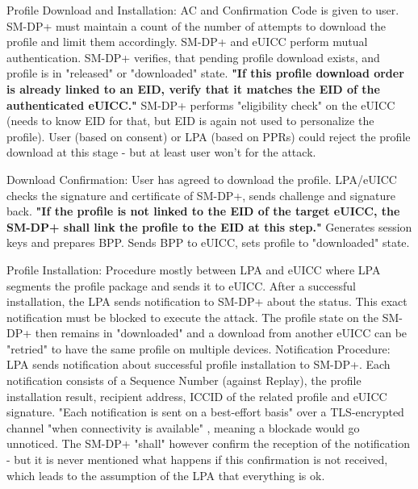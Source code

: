 Profile Download and Installation: AC and Confirmation Code is given to user. SM-DP+ must maintain a count of the number of attempts to download the profile and limit them accordingly. SM-DP+ and eUICC perform mutual authentication. SM-DP+ verifies, that pending profile download exists, and profile is in "released" or "downloaded" state. \textbf{"If this profile download order is already linked to an EID, verify that it matches the EID of the authenticated eUICC."} SM-DP+ performs "eligibility check" on the eUICC (needs to know EID for that, but EID is again not used to personalize the profile). User (based on consent) or LPA (based on PPRs) could reject the profile download at this stage - but at least user won't for the attack.

Download Confirmation: User has agreed to download the profile. LPA/eUICC checks the signature and certificate of SM-DP+, sends challenge and signature back. \textbf{"If the profile is not linked to the EID of the target eUICC, the SM-DP+ shall link the profile to the EID at this step."} Generates session keys and prepares BPP. Sends BPP to eUICC, sets profile to "downloaded" state.

Profile Installation: Procedure mostly between LPA and eUICC where LPA segments the profile package and sends it to eUICC. After a successful installation, the LPA sends notification to SM-DP+ about the status. This exact notification must be blocked to execute the attack. The profile state on the SM-DP+ then remains in "downloaded" and a download from another eUICC can be "retried" to have the same profile on multiple devices.
Notification Procedure: LPA sends notification about successful profile installation to SM-DP+. Each notification consists of a Sequence Number (against Replay), the profile installation result, recipient address, ICCID of the related profile and eUICC signature. "Each notification is sent on a best-effort basis" over a TLS-encrypted channel "when connectivity is available" \parencite{SGP:22}, meaning a blockade would go unnoticed. The SM-DP+ "shall" however confirm the reception of the notification - but it is never mentioned what happens if this confirmation is not received, which leads to the assumption of the LPA that everything is ok.

